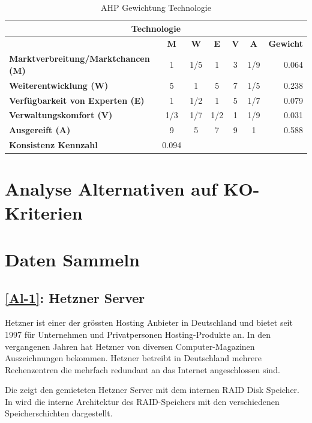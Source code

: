 \begin{table}[htbp]
\caption{AHP Gewichtung Technologie}
\begin{tabular}{|l|c|c|c|c|c|r|}
\hline
\multicolumn{ 7}{|c|}{\textbf{Technologie}} \\ \hline
 & \textbf{M} & \textbf{W} & \textbf{E} & \textbf{V} & \textbf{A} & \multicolumn{1}{l|}{\textbf{Gewicht}} \\ \hline
\textbf{Marktverbreitung/Marktchancen (M)} & 1 & 1/5 & 1 & 3 & 1/9 & 0.064 \\ \hline
\textbf{Weiterentwicklung (W)} & 5 & 1 & 5 & 7 & 1/5 & 0.238 \\ \hline
\textbf{Verfügbarkeit von Experten (E)} & 1 & 1/2 & 1 & 5 & 1/7 & 0.079 \\ \hline
\textbf{Verwaltungskomfort (V)} & 1/3 & 1/7 & 1/2 & 1 & 1/9 & 0.031 \\ \hline
\textbf{Ausgereift (A)} & 9 & 5 & 7 & 9 & 1 & 0.588 \\ \hline
\textbf{Konsistenz Kennzahl} & \multicolumn{1}{r|}{0.094} \\ \cline{1-2}
\end{tabular}
\label{AHPTechnologie}
\end{table}


\section{Analyse Alternativen auf KO-Kriterien}

\section{Daten Sammeln}
\subsection{\ref{Al-1}: Hetzner Server}
Hetzner ist einer der grössten Hosting Anbieter in Deutschland und bietet seit 1997 für Unternehmen und Privatpersonen Hosting-Produkte an. In den vergangenen Jahren hat Hetzner von diversen Computer-Magazinen Auszeichnungen bekommen. Hetzner betreibt in Deutschland mehrere Rechenzentren die mehrfach redundant an das Internet angeschlossen sind.

Die  zeigt den gemieteten Hetzner Server mit dem internen RAID Disk Speicher. In  wird die interne Architektur des RAID-Speichers mit den verschiedenen Speicherschichten dargestellt.

